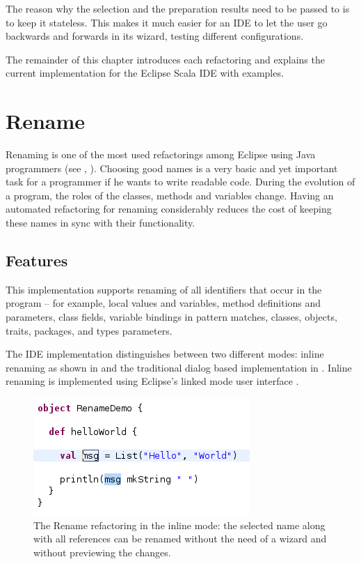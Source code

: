\documentclass[10pt,a4paper,oneside]{scrreprt}
\begin{document}
The reason why the selection and the preparation results need to be passed to  is to keep it stateless. This makes it much easier for an IDE to let the user go backwards and forwards in its wizard, testing different configurations.

The remainder of this chapter introduces each refactoring and explains the current implementation for the Eclipse Scala IDE with examples. 

\section{Rename}

Renaming is one of the most used refactorings among Eclipse using Java programmers (see \cite{RefactoringStudy}, \cite{RefactoringInEclipse}). Choosing good names is a very basic and yet important task for a programmer if he wants to write readable code. During the evolution of a program, the roles of the classes, methods and variables change. Having an automated refactoring for renaming considerably reduces the cost of keeping these names in sync with their functionality.

\subsection{Features}

This implementation supports renaming of all identifiers that occur in the program -- for example, local values and variables, method definitions and parameters, class fields, variable bindings in pattern matches, classes, objects, traits, packages, and types parameters.

The IDE implementation distinguishes between two different modes: inline renaming as shown in  and the traditional dialog based implementation in . Inline renaming is implemented using Eclipse's linked mode user interface \cite{LinkedUI}.

\begin{figure}
  \centering
  \includegraphics[width=0.5\linewidth]{rename_screenshot_1.png}
  \caption{The Rename refactoring in the inline mode: the selected name along with all references can be renamed without the need of a wizard and without previewing the changes.}
  \label{figure:rename-screenshot-1}
\end{figure}
\end{document}
